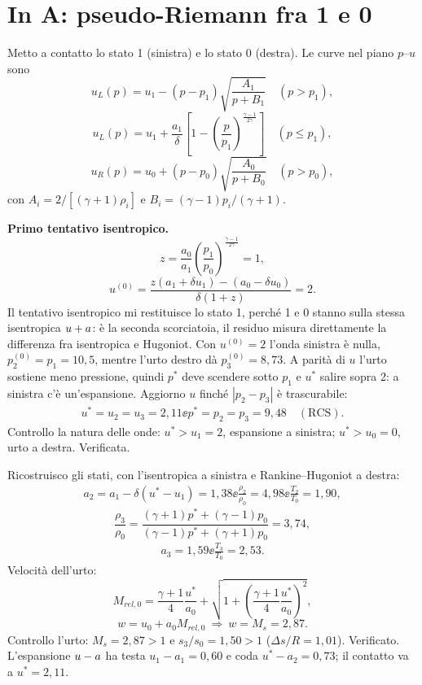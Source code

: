 \section*{In A: pseudo-Riemann fra 1 e 0}
Metto a contatto lo stato 1 (sinistra) e lo stato 0 (destra). Le curve nel piano $p$--$u$ sono
\[
u_L(p)=u_1-(p-p_1)\sqrt{\frac{A_1}{p+B_1}}\quad(p>p_1),
\]
\[
u_L(p)=u_1+\frac{a_1}{\delta}\left[1-\left(\frac{p}{p_1}\right)^{\frac{\gamma-1}{2\gamma}}\right]\quad(p\le p_1),
\]
\[
u_R(p)=u_0+(p-p_0)\sqrt{\frac{A_0}{p+B_0}}\quad(p>p_0),
\]
con $A_i=2/[(\gamma+1)\rho_i]$ e $B_i=(\gamma-1)p_i/(\gamma+1)$.

\textbf{Primo tentativo isentropico.}
\[
z=\frac{a_0}{a_1}\left(\frac{p_1}{p_0}\right)^{\frac{\gamma-1}{2\gamma}}=1,
\]
\[
u^{(0)}=\frac{z(a_1+\delta u_1)-(a_0-\delta u_0)}{\delta(1+z)}=2.
\]
Il tentativo isentropico mi restituisce lo stato 1, perché 1 e 0 stanno sulla stessa isentropica $u+a$: è la
seconda scorciatoia, il residuo misura direttamente la differenza fra isentropica e Hugoniot. Con $u^{(0)}=2$ l'onda
sinistra è nulla, $p_2^{(0)}=p_1=10{,}5$, mentre l'urto destro dà $p_3^{(0)}=8{,}73$. A parità di $u$ l'urto sostiene
meno pressione, quindi $p^*$ deve scendere sotto $p_1$ e $u^*$ salire sopra 2: a sinistra c'è un'espansione.
Aggiorno $u$ finché $|p_2-p_3|$ è trascurabile:
\begin{gather*}
u^*=u_2=u_3=2{,}11 \ee p^*=p_2=p_3=9{,}48\quad(\text{RCS}).
\end{gather*}
Controllo la natura delle onde: $u^*>u_1=2$, espansione a sinistra; $u^*>u_0=0$, urto a destra. Verificata.

Ricostruisco gli stati, con l'isentropica a sinistra e Rankine--Hugoniot a destra:
\begin{gather*}
a_2=a_1-\delta(u^*-u_1)=1{,}38 \ee \frac{\rho_2}{\rho_0}=4{,}98 \ee \frac{T_2}{T_0}=1{,}90,
\end{gather*}
\[
\frac{\rho_3}{\rho_0}=\frac{(\gamma+1)p^*+(\gamma-1)p_0}{(\gamma-1)p^*+(\gamma+1)p_0}=3{,}74,
\]
\begin{gather*}
a_3=1{,}59 \ee \frac{T_3}{T_0}=2{,}53.
\end{gather*}
Velocità dell'urto:
\[
M_{rel,0}=\frac{\gamma+1}{4}\frac{u^*}{a_0}+\sqrt{1+\left(\frac{\gamma+1}{4}\frac{u^*}{a_0}\right)^2},
\]
\[
w=u_0+a_0M_{rel,0}\ \Rightarrow\ w=M_s=2{,}87.
\]
Controllo l'urto: $M_s=2{,}87>1$ e $s_3/s_0=1{,}50>1$ ($\Delta s/R=1{,}01$). Verificato. L'espansione $u-a$ ha testa
$u_1-a_1=0{,}60$ e coda $u^*-a_2=0{,}73$; il contatto va a $u^*=2{,}11$.

